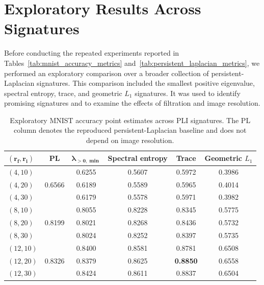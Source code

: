 \documentclass{article}
\begin{document}

\section{Exploratory Results Across Signatures}
\label{sec:additional-expeiment}

Before conducting the repeated experiments reported in Tables~\ref{tab:mnist_accuracy_metrics} and~\ref{tab:persistent_laplacian_metrics}, we performed an exploratory comparison over a broader collection of persistent-Laplacian signatures. This comparison included the smallest positive eigenvalue, spectral entropy, trace, and geometric \(L_1\) signatures. It was used to identify promising signatures and to examine the effects of filtration and image resolution.

\begin{table}[t]
\centering
\caption{Exploratory MNIST accuracy point estimates across PLI signatures. The PL column denotes the reproduced persistent-Laplacian baseline and does not depend on image resolution.}
\label{tab:old_mnist}
\small
\setlength{\tabcolsep}{4pt}
\begin{tabular}{@{}lccccc@{}}
\toprule
\(\boldsymbol{(r_f,r_i)}\) &
\textbf{PL} &
\(\boldsymbol{\lambda_{>0,\min}}\) &
\textbf{Spectral entropy} &
\textbf{Trace} &
\textbf{Geometric \(L_1\)} \\
\midrule
\((4,10)\)  & \multirow{3}{*}{0.6566} & 0.6255 & 0.5607 & 0.5972 & 0.3986 \\
\((4,20)\)  &                         & 0.6189 & 0.5589 & 0.5965 & 0.4014 \\
\((4,30)\)  &                         & 0.6179 & 0.5578 & 0.5971 & 0.3982 \\
\midrule
\((8,10)\)  & \multirow{3}{*}{0.8199} & 0.8055 & 0.8228 & 0.8345 & 0.5775 \\
\((8,20)\)  &                         & 0.8021 & 0.8268 & 0.8436 & 0.5732 \\
\((8,30)\)  &                         & 0.8024 & 0.8252 & 0.8397 & 0.5735 \\
\midrule
\((12,10)\) & \multirow{3}{*}{0.8326} & 0.8400 & 0.8581 & 0.8781 & 0.6508 \\
\((12,20)\) &                         & 0.8379 & 0.8625 & \textbf{0.8850} & 0.6558 \\
\((12,30)\) &                         & 0.8424 & 0.8611 & 0.8837 & 0.6504 \\
\bottomrule
\end{tabular}
\end{table}
\end{document}
